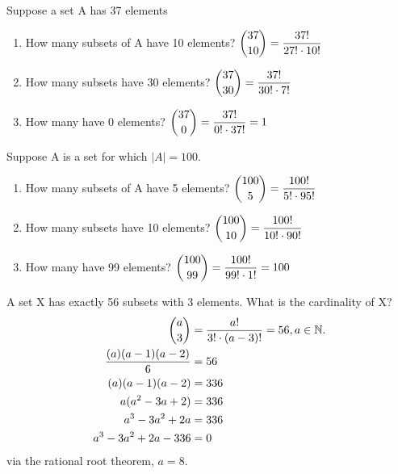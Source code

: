 \documentclass[openany, 11pt]{book}
\begin{document}
\begin{exercise}{}{}
	Suppose a set A has 37 elements
	\begin{enumerate}[label = {(\arabic*)}]
		\item How many subsets of A have 10 elements?
		      $\dbinom{37}{10} = \dfrac{37!}{27! \cdot10!}$
		\item How many subsets have 30 elements?
		      $\dbinom{37}{30} = \dfrac{37!}{30! \cdot7!}$
		\item How many have 0 elements?
		      $\dbinom{37}{0} = \dfrac{37!}{0! \cdot37!}=1$
	\end{enumerate}
\end{exercise}

\begin{exercise}{}{}
	Suppose A is a set for which $|A| = 100$.
	\begin{enumerate}[label = {(\arabic*)}]
		\item How many subsets of A have 5 elements?
		      $\dbinom{100}{5} = \dfrac{100!}{5! \cdot95!}$
		\item How many subsets have 10 elements?
		      $\dbinom{100}{10} = \dfrac{100!}{10! \cdot90!}$
		\item How many have 99 elements?
		      $\dbinom{100}{99} = \dfrac{100!}{99! \cdot1!}= 100$
	\end{enumerate}
\end{exercise}

\begin{exercise}{}{}
	A set X has exactly 56 subsets with 3 elements. What is the cardinality of X?
	\begin{align*}
		\dbinom{a}{3}            & = \dfrac{a!}{3! \cdot(a-3)!}=56, a \in \mathbb{N}. \\
		\dfrac{(a)(a-1)(a-2)}{6} & =56                                                \\
		(a)(a-1)(a-2)            & =336                                               \\
		a(a^2-3a+2)              & =336                                               \\
		a^3-3a^2+2a              & =336                                               \\
		a^3-3a^2+2a-336          & =0
	\end{align*}
	via the rational root theorem, $a=8$.
\end{exercise}
\end{document}
